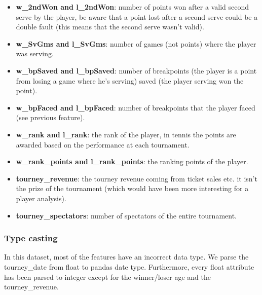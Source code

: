 \begin{itemize}
    \item \textbf{w\_2ndWon and l\_2ndWon}: number of points won after a valid second serve by the player, be aware that a point lost after a second serve could be a double fault (this means that the second serve wasn't valid).
    \item \textbf{w\_SvGms and l\_SvGms}: number of games (not points) where the player was serving.
    \item \textbf{w\_bpSaved and l\_bpSaved}: number of breakpoints (the player is a point from losing a game where he's serving) saved (the player serving won the point).
    \item \textbf{w\_bpFaced and l\_bpFaced}: number of breakpoints that the player faced (see previous feature).
    \item \textbf{w\_rank and l\_rank}: the rank of the player, in tennis the points are awarded based on the performance at each tournament.
    \item \textbf{w\_rank\_points and l\_rank\_points}: the ranking points of the player.
    \item \textbf{tourney\_revenue}: the tourney revenue coming from ticket sales etc. it isn't the prize of the tournament (which would have been more interesting for a player analysis).
    \item \textbf{tourney\_spectators}: number of spectators of the entire tournament.
\end{itemize}

\subsubsection{Type casting}
In this dataset, most of the features have an incorrect data type. We parse the tourney\_date from float to pandas date type. Furthermore, every float attribute has been parsed to integer except for the winner/loser age and the tourney\_revenue.

